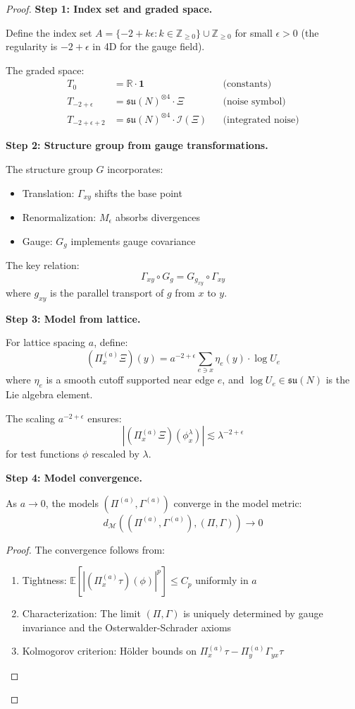 \begin{proof}
\textbf{Step 1: Index set and graded space.}

Define the index set $A = \{-2 + k\epsilon : k \in \mathbb{Z}_{\geq 0}\} \cup \mathbb{Z}_{\geq 0}$ 
for small $\epsilon > 0$ (the regularity is $-2 + \epsilon$ in 4D for the gauge field).

The graded space:
\begin{align}
T_0 &= \mathbb{R} \cdot \mathbf{1} && \text{(constants)} \\
T_{-2+\epsilon} &= \mathfrak{su}(N)^{\otimes 4} \cdot \Xi && \text{(noise symbol)} \\
T_{-2+\epsilon + 2} &= \mathfrak{su}(N)^{\otimes 4} \cdot \mathcal{I}(\Xi) && \text{(integrated noise)}
\end{align}

\textbf{Step 2: Structure group from gauge transformations.}

The structure group $G$ incorporates:
\begin{itemize}
\item Translation: $\Gamma_{xy}$ shifts the base point
\item Renormalization: $M_\epsilon$ absorbs divergences
\item Gauge: $G_g$ implements gauge covariance
\end{itemize}

The key relation:
\[
\Gamma_{xy} \circ G_g = G_{g_{xy}} \circ \Gamma_{xy}
\]
where $g_{xy}$ is the parallel transport of $g$ from $x$ to $y$.

\textbf{Step 3: Model from lattice.}

For lattice spacing $a$, define:
\[
(\Pi_x^{(a)} \Xi)(y) = a^{-2+\epsilon} \sum_{e \ni x} \eta_e(y) \cdot \log U_e
\]
where $\eta_e$ is a smooth cutoff supported near edge $e$, and $\log U_e \in \mathfrak{su}(N)$ 
is the Lie algebra element.

The scaling $a^{-2+\epsilon}$ ensures:
\[
|(\Pi_x^{(a)} \Xi)(\phi_x^\lambda)| \lesssim \lambda^{-2+\epsilon}
\]
for test functions $\phi$ rescaled by $\lambda$.

\textbf{Step 4: Model convergence.}

\begin{lemma}
As $a \to 0$, the models $(\Pi^{(a)}, \Gamma^{(a)})$ converge in the model 
metric:
\[
d_{\mathscr{M}}((\Pi^{(a)}, \Gamma^{(a)}), (\Pi, \Gamma)) \to 0
\]
\end{lemma}

\begin{proof}
The convergence follows from:
\begin{enumerate}
\item Tightness: $\mathbb{E}[|(\Pi_x^{(a)}\tau)(\phi)|^p] \leq C_p$ uniformly in $a$
\item Characterization: The limit $(\Pi, \Gamma)$ is uniquely determined by 
    gauge invariance and the Osterwalder-Schrader axioms
\item Kolmogorov criterion: Hölder bounds on $\Pi_x^{(a)}\tau - \Pi_y^{(a)}\Gamma_{yx}\tau$
\end{enumerate}
\end{proof}


\end{proof}
